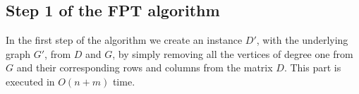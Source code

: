 \documentclass[11pt,a4paper]{article}
\theoremstyle{remark}
\theoremstyle{definition}
\begin{document}
\begin{comment}
\begin{enumerate}
    \item Create $G'$ and $D'$ from $G$ and $D$ respectively, by removing all degree $1$ vertices from $G$ and $D$.
    \item Compute a minimum feedback edge set $F$ in $G'$ (note, $F$ is also a minimum feedback edge set of $G$).
    \item Determine vertices of interest $U$ of the graph $G'$.
    \item \label{enum:FPT-labelingVerticesOfInterest} Guess the (partial) labeling $\lambda$ of $G'$, that connects all pairs of vertices from $U$, satisfying their respective values in $D'$.
    \item \label{enum:FPT-labelingraphNoLeafs} Extend the partial labeling $\lambda$ to the labeling of the whole $G'$, respecting $D'$.
    \item \label{enum:FPT-labelingWholeGraph} Extend the labeling $\lambda$ of $G'$ to the labeling of $G$, respecting $D$.
\end{enumerate}

It is important to point out, that in step~\ref{enum:FPT-labelingVerticesOfInterest}, our algorithm does not build a labeling satisfying conditions in this step,
and then tries to extend it in steps~\ref{enum:FPT-labelingraphNoLeafs} and \ref{enum:FPT-labelingWholeGraph},
but it
builds (many different instances of) integer linear program (ILP) problem with $O(k)$ variables,
with restrictions satisfying condition from steps~\ref{enum:FPT-labelingVerticesOfInterest}--\ref{enum:FPT-labelingWholeGraph}.
At the end we solve the ILP problem on all instances and if there is a positive solution, it gives rise to the desired labeling $\lambda$ of $G$.
For each of the steps we now argue its correctness and time complexity.
\end{comment}


\subsection{Step 1 of the FPT algorithm}
In the first step of the algorithm we create an instance $D'$, with the underlying graph $G'$, from $D$ and $G$, by simply removing all the vertices of degree one from $G$ and their corresponding rows and columns from the matrix $D$. 
This part is executed in $O(n+m)$ time.
\end{document}
